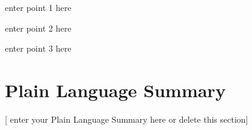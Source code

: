 \documentclass[draft]{agujournal2019}
\begin{document}


\begin{keypoints}
\item enter point 1 here
\item enter point 2 here
\item enter point 3 here

\end{keypoints}

%
%

%
%


\begin{abstract}
[ enter your Abstract here ]
\end{abstract}

\section*{Plain Language Summary}
[ enter your Plain Language Summary here or delete this section]
\end{document}
